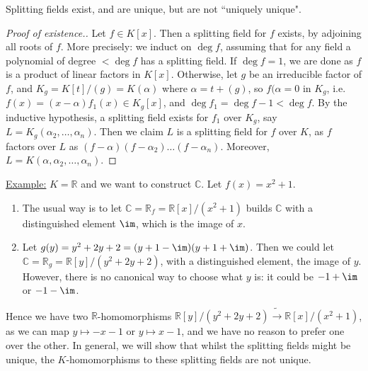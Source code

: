 \documentclass[a4paper, 10pt, twocolumn]{amsart}
\begin{document}
\begin{theorem}
Splitting fields exist, and are unique, but are not ``uniquely unique".
\end{theorem}
\begin{proof}[Proof of existence.]
Let $f \in K[x]$. Then a splitting field for $f$ exists, by adjoining all roots of $f$. More precisely: we induct on $\deg f$, assuming that for any field a polynomial of degree $< \deg f$ has a splitting field. If $\deg f = 1$, we are done as $f$ is a product of linear factors in $K[x]$. Otherwise, let $g$ be an irreducible factor of $f$, and $K_g = K[t]/(g) = K(\alpha)$ where $\alpha=t+(g)$, so $f(\alpha=0$ in $K_g$, i.e. $f(x)=(x-\alpha)f_1(x) \in K_g[x]$, and $\deg f_1 = \deg f -1 <\deg f$. By the inductive hypothesis, a splitting field exists for $f_1$ over $K_g$, say $L = K_g(\alpha_2, \ldots, \alpha_n)$. Then we claim $L$ is a splitting field for $f$ over $K$, as $f$ factors over $L$ as $(f-\alpha)(f-\alpha_2)\ldots(f-\alpha_n)$. Moreover, $L=K(\alpha,\alpha_2, \ldots, \alpha_n)$.
\end{proof}
\underline{Example:} $K=\mathbb{R}$ and we want to construct $\mathbb{C}$. Let $f(x) = x^2 +1$.
\begin{enumerate}
\item The usual way is to let $\mathbb{C} = \mathbb{R}_f = \mathbb{R}[x]/(x^2+1)$ builds $\mathbb{C}$ with a distinguished element $\im$, which is the image of $x$.
\item Let $g(y) = y^2 + 2y + 2 = (y+1-\im)(y+1+\im)$. Then we could let $\mathbb{C} = \mathbb{R}_g = \mathbb{R}[y]/(y^2+2y+2)$, with a distinguished element, the image of $y$. However, there is no canonical way to choose what $y$ is: it could be $-1+\im$ or $-1-\im$. 
\end{enumerate}
 Hence we have two $\mathbb{R}$-homomorphisms $\mathbb{R}[y]/(y^2+2y+2) \tilde{\longrightarrow} \mathbb{R}[x]/(x^2+1)$, as we can map $y\mapsto -x-1$ or $y\mapsto x-1$, and we have no reason to prefer one over the other. In general, we will show that whilst the splitting fields might be unique, the $K$-homomorphisms to these splitting fields are not unique.
 
\end{document}
